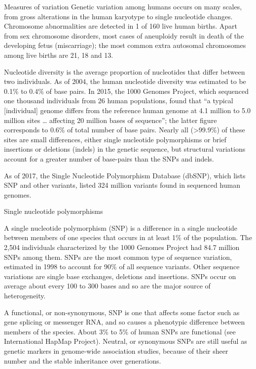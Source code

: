 Measures of variation
Genetic variation among humans occurs on many scales, from gross alterations in the human karyotype to single nucleotide changes. Chromosome abnormalities are detected in 1 of 160 live human births. Apart from sex chromosome disorders, most cases of aneuploidy result in death of the developing fetus (miscarriage); the most common extra autosomal chromosomes among live births are 21, 18 and 13.

Nucleotide diversity is the average proportion of nucleotides that differ between two individuals. As of 2004, the human nucleotide diversity was estimated to be 0.1\% to 0.4\% of base pairs. In 2015, the 1000 Genomes Project, which sequenced one thousand individuals from 26 human populations, found that ``a typical {[}individual{]} genome differs from the reference human genome at 4.1 million to 5.0 million sites \ldots{} affecting 20 million bases of sequence''; the latter figure corresponds to 0.6\% of total number of base pairs. Nearly all (\textgreater{}99.9\%) of these sites are small differences, either single nucleotide polymorphisms or brief insertions or deletions (indels) in the genetic sequence, but structural variations account for a greater number of base-pairs than the SNPs and indels.

As of 2017, the Single Nucleotide Polymorphism Database (dbSNP), which lists SNP and other variants, listed 324 million variants found in sequenced human genomes.

Single nucleotide polymorphisms

A single nucleotide polymorphism (SNP) is a difference in a single nucleotide between members of one species that occurs in at least 1\% of the population. The 2,504 individuals characterized by the 1000 Genomes Project had 84.7 million SNPs among them. SNPs are the most common type of sequence variation, estimated in 1998 to account for 90\% of all sequence variants. Other sequence variations are single base exchanges, deletions and insertions. SNPs occur on average about every 100 to 300 bases and so are the major source of heterogeneity.

A functional, or non-synonymous, SNP is one that affects some factor such as gene splicing or messenger RNA, and so causes a phenotypic difference between members of the species. About 3\% to 5\% of human SNPs are functional (see International HapMap Project). Neutral, or synonymous SNPs are still useful as genetic markers in genome-wide association studies, because of their sheer number and the stable inheritance over generations.

